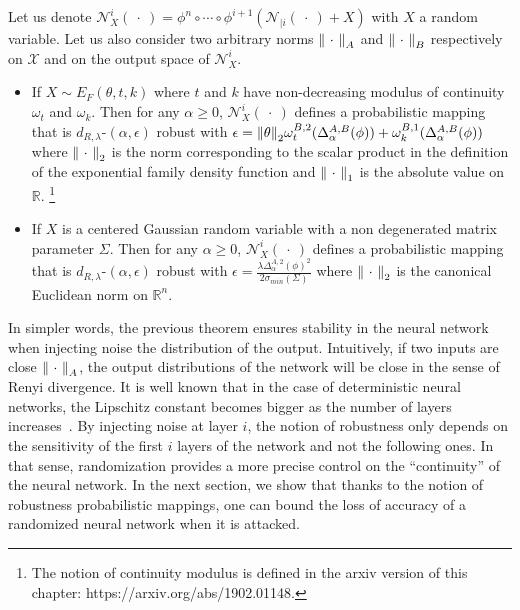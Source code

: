\begin{theorem} \label{theorem:ap3-netrob}
  Let us denote $\mathcal{N}_{X}^i(\ \cdot\ ) = \phi^n\circ \cdots \circ\phi^{i+1}(\mathcal{N}_{|i}(\ \cdot\ )+X)$ with $X$ a random variable.
  Let us also consider two arbitrary norms $\norm{\ \cdot\ }_{A}$ and $\norm{\ \cdot\ }_{B}$  respectively on $\mathcal{X}$ and on the output space of $\mathcal{N}_{X}^i$.
  \begin{itemize}
    \item If $X\sim E_{F}(\theta,t,k)$ where $t$ and $k$ have non-decreasing modulus of continuity $\omega_t$ and $\omega_k$.
    Then for any $\alpha \geq 0$, $\mathcal{N}_{X}^i(\ \cdot\ )$ defines a probabilistic mapping that is $d_{R,\lambda}$-$(\alpha,\epsilon)$ robust with $\epsilon = \norm{\theta}_2 \omega^{B,2}_t(\Delta^{A,B}_{\alpha}(\phi)) +\omega_k^{B,1}(\Delta^{A,B}_{\alpha}(\phi)) $ where $\norm{\ \cdot\ }_2$ is the norm corresponding to the scalar product in the definition of the exponential family density function and $\norm{\ \cdot\ }_1$ is the absolute value on $\mathbb{R}$.
    \footnote{The notion of continuity modulus is defined in the arxiv version of this chapter: https://arxiv.org/abs/1902.01148.}
    \item If $X$ is a centered Gaussian random variable with a non degenerated matrix parameter $\Sigma$.
      Then for any $\alpha \geq 0$, $\mathcal{N}_{X}^i(\ \cdot\ )$ defines a probabilistic mapping that is $d_{R,\lambda}$-$(\alpha,\epsilon)$ robust with $ \epsilon = \frac{\lambda \Delta^{A,2}_{\alpha}(\phi)^2 }{2 \sigma_{min}(\Sigma) } $ where $\norm{\ \cdot\ }_2$ is the canonical Euclidean norm on $\mathbb{R}^n$.
  \end{itemize}
  \removespace
\end{theorem}

In simpler words, the previous theorem ensures stability in the neural network when injecting noise \wrt the distribution of the output.
Intuitively, if two inputs are close \wrt $\norm{\ \cdot\ }_{A}$, the output distributions of the network will be close in the sense of Renyi divergence.
It is well known that in the case of deterministic neural networks, the Lipschitz constant becomes bigger as the number of layers increases~\cite{gouk2018regularisation}.
By injecting noise at layer $i$, the notion of robustness only depends on the sensitivity of the first $i$ layers of the network and not the following ones.
In that sense, randomization provides a more precise control on the ``continuity'' of the neural network.
In the next section, we show that thanks to the notion of robustness \wrt probabilistic mappings, one can bound the loss of accuracy of a randomized neural network when it is attacked. 

